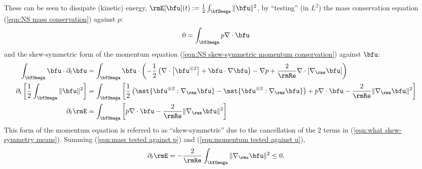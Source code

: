     These can be seen to dissipate (kinetic) energy, $\rmE[\bfu](t)  :=  \frac{1}{2}\int_{\bfOmega}\|\bfu\|^{2}$, by ``testing'' (in $L^{2}$) the mass conservation equation (\ref{eqn:NS mass conservation}) against $p$:
    \begin{equation}\label{eqn:mass tested against p}
        0  =  \int_{\bfOmega}p\nabla\cdot\bfu
    \end{equation}
    and the skew-symmetric form of the momentum equation (\ref{eqn:NS skew-symmetric momentum conservation}) against $\bfu$:
    \begin{align}
        \int_{\bfOmega}\bfu\cdot\partial_{t}\bfu  &=  \int_{\bfOmega}\bfu\cdot\left(- \frac{1}{2}\left(\nabla\cdot\left[\bfu^{\otimes 2}\right] + \bfu\cdot\nabla\bfu\right) - \nabla p + \frac{2}{\rmRe}\nabla\cdot[\nabla_{\rms}\bfu]\right)  \\
        \partial_{t}\left[\frac{1}{2}\int_{\bfOmega}\|\bfu\|^{2}\right]  &=  \int_{\bfOmega}\left[\frac{1}{2}\left(\mst{\bfu^{\otimes 2}:\nabla_{\rms}\bfu} - \mst{\bfu^{\otimes 2}:\nabla_{\rms}\bfu}\right) + p\nabla\cdot\bfu - \frac{2}{\rmRe}\|\nabla_{\rms}\bfu\|^{2}\right]  \label{eqn:what skew-symmetry means}  \\
        \partial_{t}\rmE  &=  \int_{\bfOmega}\left[p\nabla\cdot\bfu - \frac{2}{\rmRe}\|\nabla_{\rms}\bfu\|^{2}\right]  \label{eqn:momentum tested against u}
    \end{align}
    This form of the momentum equation is referred to as ``skew-symmetric'' due to the cancellation of the 2 terms in (\ref{eqn:what skew-symmetry means}). Summing (\ref{eqn:mass tested against p}) and (\ref{eqn:momentum tested against u}),
    \begin{equation}
        \partial_{t}\rmE  =  - \frac{2}{\rmRe}\int_{\bfOmega}\|\nabla_{\rms}\bfu\|^{2}  \leq  0.
    \end{equation}

